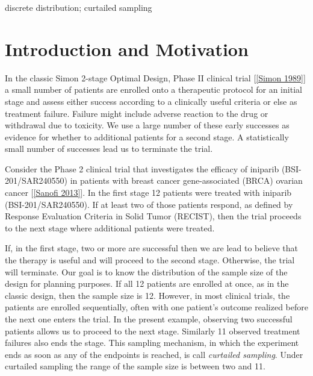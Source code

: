 \documentclass[12pt]{article}         %
\begin{document}
\bigskip

  discrete distribution; curtailed sampling




\thispagestyle{empty}
\setcounter{page}{1}


\section            {Introduction and Motivation}


In the classic Simon 2-stage Optimal Design, Phase II clinical trial [\ref{Simon 1989}] a small number of patients are enrolled onto a therapeutic protocol for an initial stage and assess either success according to a clinically useful criteria or else as treatment failure. Failure might include adverse reaction to the drug or withdrawal due to toxicity. We use a large number of these early successes as evidence for whether to additional patients for a second stage. A statistically small number of successes lead us to terminate the trial.

Consider the Phase 2 clinical trial that investigates the efficacy of iniparib (BSI-201/SAR240550) in patients with breast cancer gene-associated (BRCA) ovarian cancer [\ref{Sanofi 2013}]. In the first stage 12 patients were treated with iniparib (BSI-201/SAR240550). If at least two of those patients respond, as defined by Response Evaluation Criteria in Solid Tumor (RECIST), then the trial proceeds to the next stage where additional patients were treated.

If, in the first stage, two or more are successful then we are lead to believe that the therapy is useful and will proceed to the second stage. Otherwise, the trial will terminate. Our goal is to know the distribution of the sample size of the design for planning purposes.
If all 12 patients are enrolled at once, as in the classic design, then the sample size is 12. However, in most clinical trials, the patients are enrolled sequentially, often with one patient's outcome realized before the next one enters the trial. In the present example, observing two successful patients allows us to proceed to the next stage. Similarly 11 observed treatment failures also ends the stage. This sampling mechanism, in which the experiment ends as soon as any of the endpoints is reached, is call {\em curtailed sampling}. Under curtailed sampling the range of the sample size is between two and 11.
\end{document}
